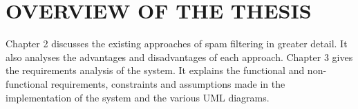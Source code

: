 \section{OVERVIEW OF THE THESIS}

Chapter 2 discusses the existing approaches of spam filtering in greater detail. It also analyses the advantages and disadvantages of each approach. Chapter 3 gives the requirements analysis of the system. It explains the functional and non-functional requirements, constraints and assumptions made in the implementation of the system and the various UML diagrams. 


